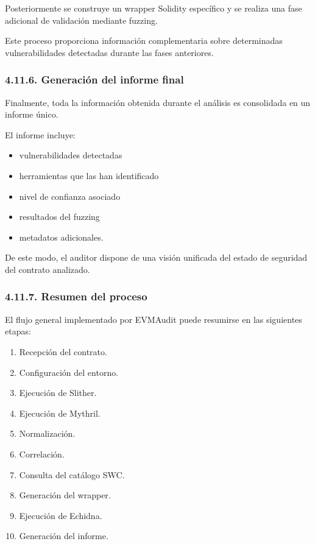 Posteriormente se construye un wrapper Solidity específico y se realiza
una fase adicional de validación mediante fuzzing.

Este proceso proporciona información complementaria sobre determinadas
vulnerabilidades detectadas durante las fases anteriores.

\subsubsection{4.11.6. Generación del informe
final}\label{generaciuxf3n-del-informe-final}

Finalmente, toda la información obtenida durante el análisis es
consolidada en un informe único.

El informe incluye:

\begin{itemize}
\tightlist
\item
  vulnerabilidades detectadas
\item
  herramientas que las han identificado
\item
  nivel de confianza asociado
\item
  resultados del fuzzing
\item
  metadatos adicionales.
\end{itemize}

De este modo, el auditor dispone de una visión unificada del estado de
seguridad del contrato analizado.

\subsubsection{4.11.7. Resumen del proceso}\label{resumen-del-proceso}

El flujo general implementado por EVMAudit puede resumirse en las
siguientes etapas:

\begin{enumerate}
\def\labelenumi{\arabic{enumi}.}
\tightlist
\item
  Recepción del contrato.
\item
  Configuración del entorno.
\item
  Ejecución de Slither.
\item
  Ejecución de Mythril.
\item
  Normalización.
\item
  Correlación.
\item
  Consulta del catálogo SWC.
\item
  Generación del wrapper.
\item
  Ejecución de Echidna.
\item
  Generación del informe.
\end{enumerate}

